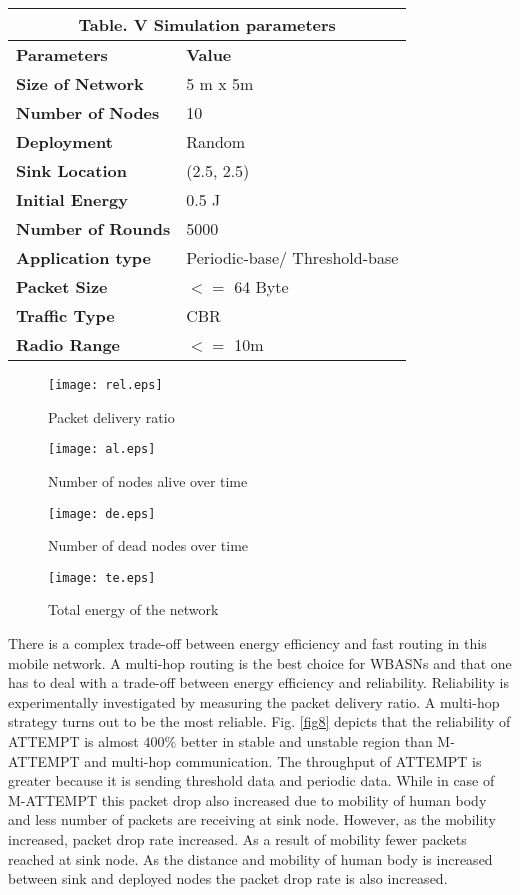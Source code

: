 \documentclass[journal]{IEEEtran}
\begin{document}
\begin{table}[!ht]
\begin{center}
\begin{tabular}{| p{3cm} || p{3cm} |}
  \multicolumn{2}{c}{Table. V Simulation parameters}\\
  \hline
  \textbf{Parameters}         &  \textbf{Value}   \\ \hline \hline
   \textbf{Size of Network	} &  5 m x 5m	 \\ \hline
    \textbf{Number of Nodes}  &  10	         \\ \hline
     \textbf{Deployment}      &  Random      \\ \hline
      \textbf{Sink Location}  &  (2.5, 2.5)	 \\ \hline
   \textbf{Initial Energy}	  &  0.5 J	     \\ \hline
   \textbf{Number of Rounds}  &  5000	     \\ \hline
   \textbf{Application type}  &  Periodic-base/ Threshold-base	 \\ \hline
     \textbf{Packet Size}     &  $<=$ 64 Byte	 \\ \hline
     \textbf{Traffic Type}    &  CBR         \\ \hline
     \textbf{Radio Range}     &  $<=$ 10m	 \\ \hline
\end{tabular}
\end{center}
\end{table}




\begin{figure}[ht]
\begin{center}
\texttt{[image: rel.eps]}
\caption{Packet delivery ratio}\label{fig8}
\texttt{[image: al.eps]}
\caption{Number of nodes alive over time }\label{fig9}
\texttt{[image: de.eps]}
\caption{Number of dead nodes over time }\label{fig10}
\texttt{[image: te.eps]}
\caption{Total energy of the network}\label{fig11}
\end{center}
\end{figure}

There is a complex trade-off between energy efficiency and fast routing in this mobile network. A multi-hop routing is the best choice for WBASNs and that one has to deal with a trade-off between energy efficiency and reliability. Reliability is experimentally investigated by measuring the packet delivery ratio. A multi-hop strategy turns out to be the most reliable. Fig. \ref{fig8} depicts that the reliability of ATTEMPT is almost $400\%$ better in stable and unstable region than M-ATTEMPT and multi-hop communication. The throughput of ATTEMPT is greater because it is sending threshold data and periodic data. While in case of M-ATTEMPT this packet drop also increased due to mobility of human body and less number of packets are receiving at sink node. However, as the mobility increased, packet drop rate increased. As a result of mobility fewer packets reached at sink node. As the distance and mobility of human body is increased between sink and deployed nodes the packet drop rate is also increased.
\end{document}
